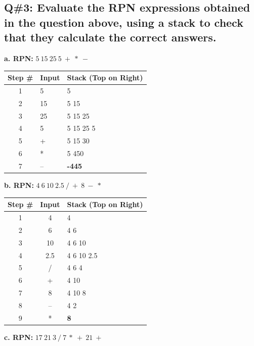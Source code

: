 \subsection*{Q\#3: Evaluate the RPN expressions obtained in the question above, using a stack to check that they
calculate the correct answers.}
\textbf{a. RPN: } $5\ 15\ 25\ 5\ +\ *\ -$

\begin{center}
\begin{tabularx}{\textwidth}{|c|X|X|}
\hline
\textbf{Step \#} & \textbf{Input} & \textbf{Stack (Top on Right)} \\
\hline
1 & 5 & 5 \\
\hline
2 & 15 & 5 15 \\
\hline
3 & 25 & 5 15 25 \\
\hline
4 & 5 & 5 15 25 5 \\
\hline
5 & + & 5 15 30 \\
\hline
6 & * & 5 450 \\
\hline
7 & – & \textbf{-445} \\
\hline
\end{tabularx}
\end{center}

\vspace{1em}

\textbf{b. RPN: } $4\ 6\ 10\ 2.5\ /\ +\ 8\ -\ *$

\begin{center}
\begin{tabular}{|c|c|l|}
\hline
\textbf{Step \#} & \textbf{Input} & \textbf{Stack (Top on Right)} \\
\hline
1 & 4 & 4 \\
2 & 6 & 4 6 \\
3 & 10 & 4 6 10 \\
4 & 2.5 & 4 6 10 2.5 \\
5 & / & 4 6 4 \\
6 & + & 4 10 \\
7 & 8 & 4 10 8 \\
8 & – & 4 2 \\
9 & * & \textbf{8} \\
\hline
\end{tabular}
\end{center}

\vspace{1em}

\textbf{c. RPN: } $17\ 21\ 3\ /\ 7\ *\ +\ 21\ +$

